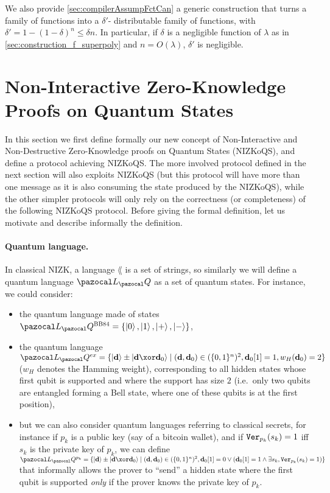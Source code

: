 We also provide \cref{sec:compilerAssumpFctCan} a generic construction that turns a \AssumpFct{} family of functions into a $\delta'$-\AssumpFctCanNoDelta{} distributable family of functions, with $\delta' = 1-(1-\delta)^n\leq \delta n$. In particular, if $\delta$ is a negligible function of $\lambda$ as in \cref{sec:construction_f_superpoly} and $n = O(\lambda)$, $\delta'$ is negligible.

\section{Non-Interactive Zero-Knowledge Proofs on Quantum States}\label{sec:NIZKoQS}

In this section we first define formally our new concept of Non-Interactive and Non-Destructive Zero-Knowledge proofs on Quantum States (NIZKoQS), and define a protocol achieving NIZKoQS. The more involved protocol \authBlindCanDist{} defined in the next section will also exploits NIZKoQS (but this protocol will have more than one message as it is also consuming the state produced by the NIZKoQS), while the other simpler protocols will only rely on the correctness (or completeness) of the following NIZKoQS protocol. Before giving the formal definition, let us motivate and describe informally the definition.

\paragraph{Quantum language.} In classical NIZK, a language $\lang$ is a set of strings, so similarly we will define a quantum language $\lang_\cQ$ as a set of quantum states. For instance, we could consider:
\begin{itemize}
\item the quantum language made of \BBHeightyFor{} states $\lang_\cQ^{\BBHeightyFor{}} = \{\ket{0}, \ket{1}, \ket{+}, \ket{-}\}$,
\item the quantum language $\lang_\cQ^{ex} = \{\ket{\vect{d}} \pm \ket{\vect{d} \xor \vect{d}_0} \mid (\vect{d},\vect{d}_0) \in (\{0,1\}^n)^2, \vect{d}_0[1] = 1, w_H(\vect{d}_0) = 2\}$ ($w_H$ denotes the Hamming weight), corresponding to all hidden \GHZ{} states whose first qubit is supported and where the support has size $2$ (i.e.\ only two qubits are entangled forming a Bell state, where one of these qubits is at the first position),
\item but we can also consider quantum languages referring to classical secrets, for instance if $p_k$ is a public key (say of a bitcoin wallet), and if ${\tt Ver}_{p_k}(s_k) = 1$ iff $s_k$ is the private key of $p_k$, we can define $\lang_\cQ^{p_k} = \{\ket{\vect{d}} \pm \ket{\vect{d} \xor \vect{d}_0} \mid (\vect{d},\vect{d}_0) \in (\{0,1\}^n)^2, \vect{d}_0[1] = 0 \lor (\vect{d}_0[1] = 1 \land \exists s_k, \Ver_{p_k}(s_k) = 1)\}$ that informally allows the prover to ``send'' a hidden \GHZ{} state where the first qubit is supported \emph{only} if the prover knows the private key of $p_k$.
\end{itemize}

